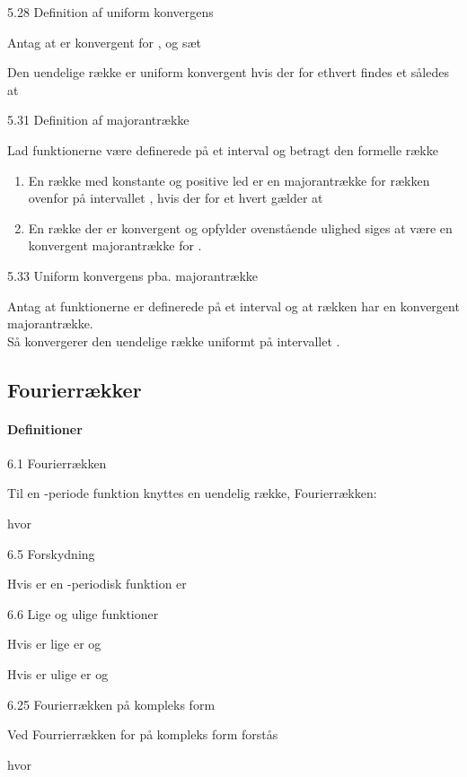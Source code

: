 \documentclass[
]{article}
\begin{document}
5.28 Definition af uniform konvergens

Antag at {} er konvergent for {}, og sæt

Den uendelige række {} er uniform konvergent hvis der for ethvert {}
findes et {} således at

5.31 Definition af majorantrække

Lad funktionerne {} være definerede på et interval {} og betragt den
formelle række

\begin{enumerate}
\item
  En række {} med konstante og positive led {} er en majorantrække for
  rækken ovenfor på intervallet {}, hvis der for et hvert {} gælder at
\item
  En række {} der er konvergent og opfylder ovenstående ulighed siges at
  være en konvergent majorantrække for {}.
\end{enumerate}

5.33 Uniform konvergens pba. majorantrække

Antag at funktionerne {} er definerede på et interval {} og at rækken {}
har en konvergent majorantrække.\\
Så konvergerer den uendelige række {} uniformt på intervallet {}.

\subsection{Fourierrækker}\label{fourierruxe6kker}

\paragraph{Definitioner}\label{definitioner}

6.1 Fourierrækken

Til en {}-periode funktion {} knyttes en uendelig række, Fourierrækken:

hvor

6.5 Forskydning

Hvis {} er en {}-periodisk funktion er

6.6 Lige og ulige funktioner

Hvis {} er lige er {} og

Hvis {} er ulige er {} og

6.25 Fourierrækken på kompleks form

Ved Fourrierrækken for {} på kompleks form forstås

hvor
\end{document}
